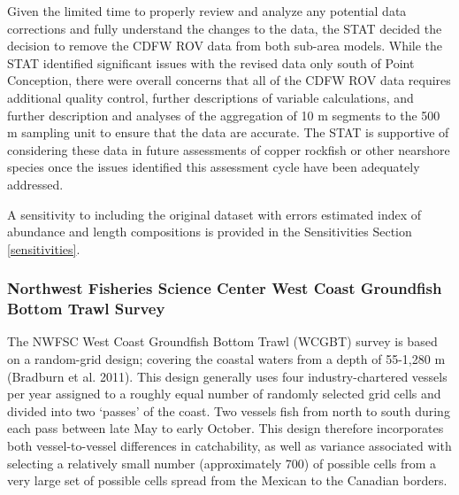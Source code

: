 \documentclass[11pt,
  english,
  letterpaper,
]{article}
\begin{document}
Given the limited time to properly review and analyze any potential data corrections and fully understand the changes to the data, the STAT decided the decision to remove the CDFW ROV data from both sub-area models. While the STAT identified significant issues with the revised data only south of Point Conception, there were overall concerns that all of the CDFW ROV data requires additional quality control, further descriptions of variable calculations, and further description and analyses of the aggregation of 10 m segments to the 500 m sampling unit to ensure that the data are accurate. The STAT is supportive of considering these data in future assessments of copper rockfish or other nearshore species once the issues identified this assessment cycle have been adequately addressed.

A sensitivity to including the original dataset with errors estimated index of abundance and length compositions is provided in the Sensitivities Section \ref{sensitivities}.

\hypertarget{northwest-fisheries-science-center-west-coast-groundfish-bottom-trawl-survey}{%
\subsubsection{Northwest Fisheries Science Center West Coast Groundfish Bottom Trawl Survey}\label{northwest-fisheries-science-center-west-coast-groundfish-bottom-trawl-survey}}

The NWFSC West Coast Groundfish Bottom Trawl (WCGBT) survey is based on a random-grid design; covering the coastal waters from a depth of 55-1,280 m (Bradburn et al. 2011). This design generally uses four industry-chartered vessels per year assigned to a roughly equal number of randomly selected grid cells and divided into two `passes' of the coast. Two vessels fish from north to south during each pass between late May to early October. This design therefore incorporates both vessel-to-vessel differences in catchability, as well as variance associated with selecting a relatively small number (approximately 700) of possible cells from a very large set of possible cells spread from the Mexican to the Canadian borders.
\end{document}

